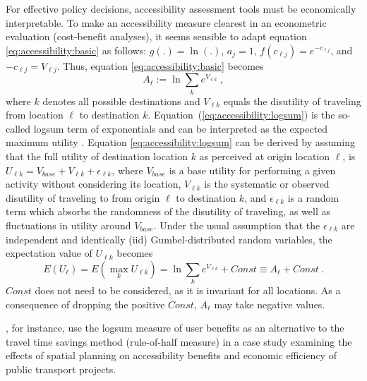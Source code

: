 For effective policy decisions, accessibility assessment tools must be economically interpretable.
To make an accessibility measure clearest in an econometric evaluation (\eg cost-benefit 
analyses), it seems sensible to adapt equation \ref{eq:accessibility:basic} as 
follows: $g(.) = \ln(.)$, $a_j = 1$, $f(c_{\ell j}) = e^{-c_{\ell j}}$, and $-c_{\ell j} = V_{\ell j}$. Thus, 
equation \ref{eq:accessibility:basic} becomes
\begin{equation}
	A_\ell := \ln \sum_k e^{V_{\ell k}} \ ,
	\label{eq:accessibility:logsum}
\end{equation}
where $k$ denotes all possible destinations and $V_{\ell k}$ equals the disutility of traveling from location $\ell$
to destination $k$. Equation~(\ref{eq:accessibility:logsum}) is the so-called \gls{logsum} term of exponentials and can be interpreted
as the expected maximum utility \citep[e.g.,][]{BenAkivaLerman_1985,deJongEtAl2007LogsumTRA}. Equation
\ref{eq:accessibility:logsum} can be derived by assuming that the full utility of destination location $k$ as
perceived at origin location $\ell$, is $U_{\ell k} = V_{base} + V_{\ell k} + \epsilon_{\ell k}$,
where $V_{base}$ is a base utility for performing a given activity without considering its location,
$V_{\ell k}$ is the systematic or observed disutility of traveling to from origin $\ell$ to destination $k$,
and $\epsilon_{\ell k}$ is a random term which absorbs the randomness of the disutility of traveling, as well as
fluctuations in utility around $V_{base}$. Under the usual assumption that the $\epsilon_{\ell k}$ are
independent and identically (iid) Gumbel-distributed random variables, the expectation value of $U_{\ell k}$ becomes
\begin{equation}
	E(U_\ell) = E(\max_k U_{\ell k}) = \ln \sum_k e^{V_{\ell k}} + Const \equiv A_\ell + Const \ .
\end{equation}
$Const$ does not need to be considered, as it is invariant for all locations. As a consequence of dropping the positive $Const$, $A_\ell$ may take negative values.

\citet{GeursEtAl2012AccessibilityBenefitsNetherlands}, for instance, use the \gls{logsum} measure of user benefits 
as an alternative to the travel time savings method (\ie rule-of-half measure) in a case study 
examining the effects of spatial planning on accessibility benefits and economic efficiency of public 
transport projects.

